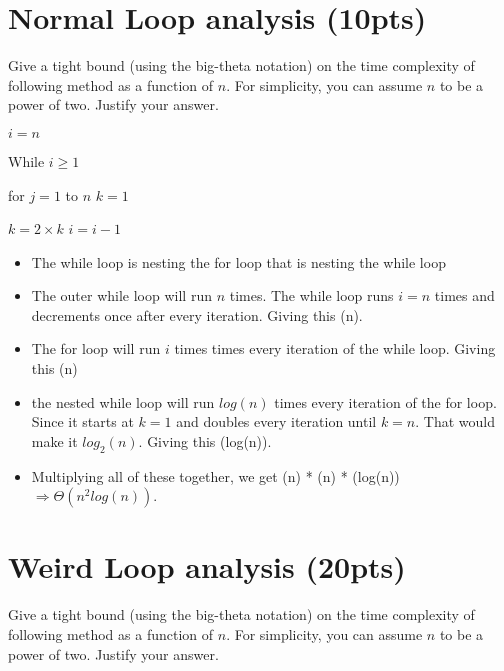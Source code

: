 \documentclass{article}[12pt]
\begin{document}
\newpage
\section{Normal Loop analysis (10pts)}

Give a tight bound (using the big-theta notation) on the time complexity of 
following method as a function of $n$. For simplicity, 
you can assume $n$ to be a power of two. Justify your answer.

\hfill \break

\begin{algorithmic}
\State $i = n$

While {$i \geq 1$}

for {$j = 1$ to $n$}
        \State $k = 1$


            \State $k = 2 \times k$
    \State $i = i - 1$
\EndFunction
\end{algorithmic}

\begin{itemize}
  \item The while loop is nesting the for loop that is nesting the while loop
  \item The outer while loop will run $n$ times. 
   The while loop runs $i = n$ times and decrements once after every iteration.
  Giving this \Theta(n).
  \item The for loop will run $i$ times times every iteration of the while loop.
    Giving this \Theta(n)
  \item the nested while loop will run $log(n)$ times every iteration of the for loop.
    Since it starts at $k = 1$ and doubles every iteration until $k = n$. 
    That would make it $log_2(n)$.
    Giving this \Theta(log(n)).

  \item Multiplying all of these together, we get \Theta(n) * \Theta(n) * \Theta(log(n))
    $\Rightarrow \Theta(n^2log(n))$.
\end{itemize}

\newpage
\section{Weird Loop analysis (20pts)}

Give a tight bound (using the big-theta notation) on the time complexity of following method as a function of $n$. For simplicity, you can assume $n$ to be a power of two. Justify your answer.
\end{document}
